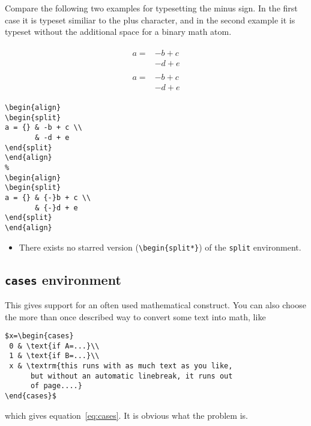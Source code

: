 \begin{table}[htb]
Compare the following two examples for typesetting the minus sign. In the first case it
is typeset similiar to the plus character, and in the second example it is typeset
without the additional space for a binary math atom.  

\begin{minipage}{0.49\linewidth}
\begin{align}
\begin{split}
a = {} & -b + c \\
       & -d + e
\end{split}
\end{align}
%
\begin{align}
\begin{split}
a = {} & {-}b + c \\
       & {-}d + e
\end{split}
\end{align}
\end{minipage}\hfill
\begin{minipage}{0.49\linewidth}
\begin{lstlisting}
\begin{align}
\begin{split}
a = {} & -b + c \\
       & -d + e
\end{split}
\end{align}
%
\begin{align}
\begin{split}
a = {} & {-}b + c \\
       & {-}d + e
\end{split}
\end{align}
\end{lstlisting}
\end{minipage}

\begin{itemize}
\item There exists no starred version (\texttt{\textbackslash{}begin\{split{*}\}})    %
of the \texttt{split} environment.
\end{itemize}


\subsection{\texttt{cases} environment }

This gives support for an often used mathematical construct.
You can also choose the more than once described way to convert some
text into math, like
{\footnotesize\begin{verbatim}
$x=\begin{cases}
 0 & \text{if A=...}\\
 1 & \text{if B=...}\\
 x & \textrm{this runs with as much text as you like,
      but without an automatic linebreak, it runs out
      of page....}
\end{cases}$
\end{verbatim}}
\noindent which gives equation~\vref{eq:cases}. It is obvious what the problem
is.


\end{table}
